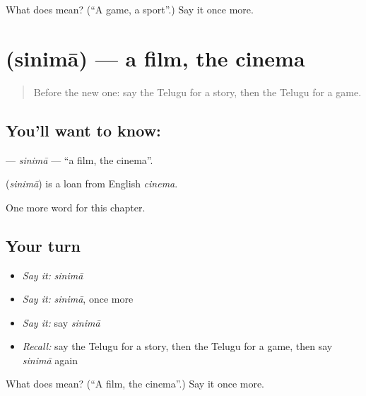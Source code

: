 \begin{tcolorbox}[breakable,colback=teal!4,colframe=teal!35!black,title={Before you move on}]
What does  mean? (\textquotedblleft{}A game, a sport\textquotedblright{}.) Say it once more.
\end{tcolorbox}
\section[\texorpdfstring{\te{సినిమా} (sinimā)}{సినిమా (sinimā)}]{ (sinimā) — a film, the cinema}

\label{lesson:TE-C312-sinima}



\begin{quote}
Before the new one: say the Telugu for a story, then the Telugu for a game.
\end{quote}

\subsection*{You'll want to know: }
\textbf{} — \emph{sinimā} — \textquotedblleft{}a film, the cinema\textquotedblright{}.

\begin{cousinweb}
\textbf{} (\emph{sinimā}) is a loan from English \emph{cinema}.
\end{cousinweb}

\begin{grammarlens}[title={What you've built}]
One more word for this chapter.
\end{grammarlens}

\subsection*{Your turn}
\begin{itemize}
\raggedright
  \item \emph{Say it:} \emph{sinimā}
  \item \emph{Say it:} \emph{sinimā}, once more
  \item \emph{Say it:} say \emph{sinimā}
  \item \emph{Recall:} say the Telugu for a story, then the Telugu for a game, then say \emph{sinimā} again
\end{itemize}

\begin{tcolorbox}[breakable,colback=teal!4,colframe=teal!35!black,title={Before you move on}]
What does  mean? (\textquotedblleft{}A film, the cinema\textquotedblright{}.) Say it once more.
\end{tcolorbox}
